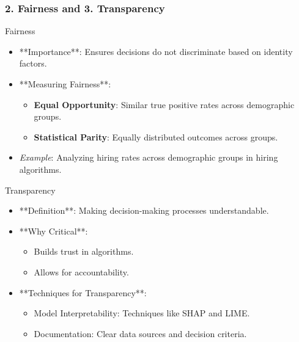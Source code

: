 \documentclass[aspectratio=169]{beamer}
\begin{document}
\begin{frame}[fragile]
    \frametitle{2. Fairness and 3. Transparency}
    \begin{block}{Fairness}
        \begin{itemize}
            \item **Importance**: Ensures decisions do not discriminate based on identity factors.
            \item **Measuring Fairness**:
            \begin{itemize}
                \item \textbf{Equal Opportunity}: Similar true positive rates across demographic groups.
                \item \textbf{Statistical Parity}: Equally distributed outcomes across groups.
            \end{itemize}
            \item \textit{Example}: Analyzing hiring rates across demographic groups in hiring algorithms.
        \end{itemize}
    \end{block}
    
    \begin{block}{Transparency}
        \begin{itemize}
            \item **Definition**: Making decision-making processes understandable.
            \item **Why Critical**:
            \begin{itemize}
                \item Builds trust in algorithms.
                \item Allows for accountability.
            \end{itemize}
            \item **Techniques for Transparency**:
            \begin{itemize}
                \item Model Interpretability: Techniques like SHAP and LIME.
                \item Documentation: Clear data sources and decision criteria.
            \end{itemize}
        \end{itemize}
    \end{block}
\end{frame}
\end{document}
